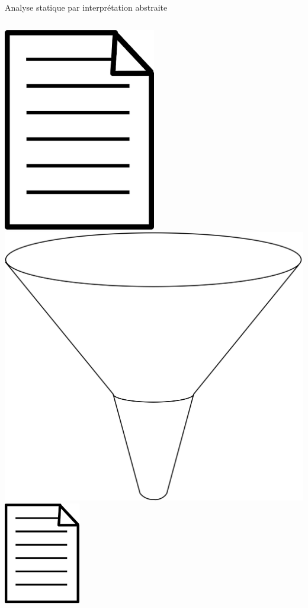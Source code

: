 \documentclass[xcolor={dvipsnames}]{beamer}
\begin{document}
\begin{frame}{Analyse statique par interprétation abstraite}
  \begin{columns}
    \begin{column}{0.3\textwidth}
      \begin{center}
        \includegraphics[width=0.5\textwidth]{media/fichier.png}
        \includegraphics[width=\textwidth]{media/entonnoir.png}
        \includegraphics[width=0.25\textwidth]{media/fichier.png}

\end{center}
\end{column}
\end{columns}
\end{frame}
\end{document}
